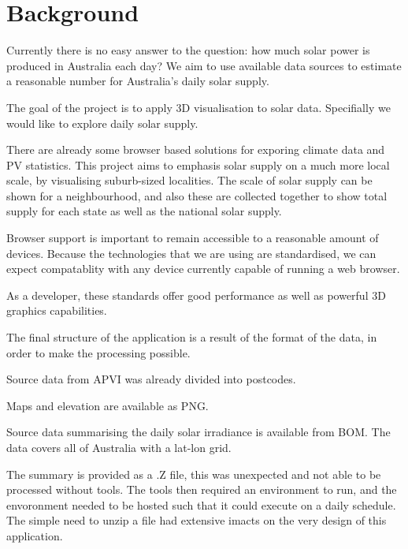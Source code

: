 \documentclass[12pt,a4paper]{report}
\begin{document}
\section{Background}

Currently there is no easy answer to the question: how much solar power is produced in Australia each day? We aim to use available data sources to estimate a reasonable number for Australia's daily solar supply. 

The goal of the project is to apply 3D visualisation to solar data. Specifially we would like to explore daily solar supply.

There are already some browser based solutions for exporing climate data and PV statistics. This project aims to emphasis solar supply on a much more local scale, by visualising suburb-sized localities. The scale of solar supply can be shown for a neighbourhood, and also these are collected together to show total supply for each state as well as the national solar supply. 

Browser support is important to remain accessible to a reasonable amount of devices. Because the technologies that we are using are standardised, we can expect compatablity with any device currently capable of running a web browser. 

As a developer, these standards offer good performance as well as powerful 3D graphics capabilities.

The final structure of the application is a result of the format of the data, in order to make the processing possible.

Source data from APVI was already divided into postcodes.

Maps and elevation are available as PNG.

Source data summarising the daily solar irradiance is available from BOM. The data covers all of Australia with a lat-lon grid. 

The summary is provided as a .Z file, this was unexpected and not able to be processed without tools. The tools then required an environment to run, and the envoronment needed to be hosted such that it could execute on a daily schedule. The simple need to unzip a file had extensive imacts on the very design of this application.

\end{document}
